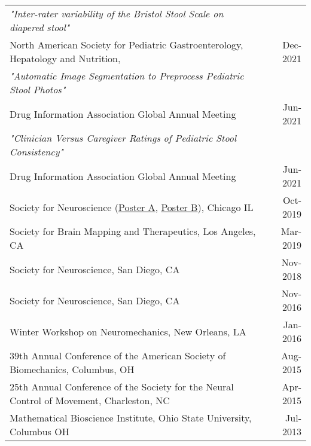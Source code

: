 \documentclass[10pt,a4paper]{article}
\begin{document}
  \vspace*{1mm}\noindent\begin{tabularx}{17cm}{X r}
      \textit{"Inter-rater variability of the Bristol Stool Scale on diapered stool"}\\
    North American Society for Pediatric Gastroenterology, Hepatology and Nutrition, & Dec-2021\\[2mm] %

    \textit{"Automatic Image Segmentation to Preprocess Pediatric Stool Photos"}\\
    Drug Information Association Global Annual Meeting & Jun-2021\\[2mm]
    \textit{"Clinician Versus Caregiver Ratings of Pediatric Stool Consistency"}\\
    Drug Information Association Global Annual Meeting & Jun-2021\\[2mm]

    Society for Neuroscience (\href{https://github.com/bc/resume/blob/master/conferences/sfn2019_a.pdf}{Poster A}, \href{https://github.com/bc/resume/blob/master/conferences/sfn2019_b.pdf}{Poster B}), Chicago IL & Oct-2019 \\ %
    Society for Brain Mapping and Therapeutics, Los Angeles, CA & Mar-2019 \\ %
    Society for Neuroscience, San Diego, CA & Nov-2018 \\ %
    Society for Neuroscience, San Diego, CA& Nov-2016 \\ 
    Winter Workshop on Neuromechanics, New Orleans, LA & Jan-2016 \\ %
    39th Annual Conference of the American Society of Biomechanics, Columbus, OH & Aug-2015 \\
    25th Annual Conference of the Society for the Neural Control of Movement, Charleston, NC & Apr-2015 \\
    Mathematical Bioscience Institute, Ohio State University, Columbus OH & Jul-2013\\
  \end{tabularx}
\end{document}
